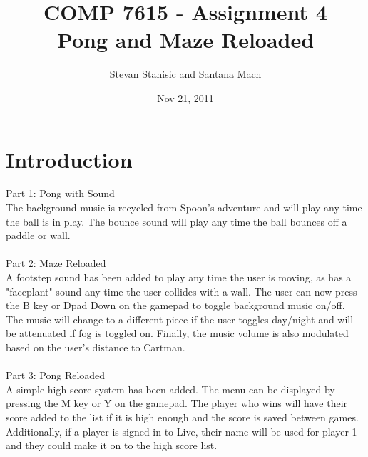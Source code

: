 \documentclass[titlepage]{article}
\begin{document}
\author{Stevan Stanisic and Santana Mach}
\title{COMP 7615 - Assignment 4 \\ Pong and Maze Reloaded}
\date{Nov 21, 2011}
\maketitle{}

\pagebreak

\section{Introduction}

Part 1: Pong with Sound \\
The background music is recycled from Spoon's adventure and will play any time the ball is in play. The bounce sound will play any time the ball bounces off a paddle or wall. \\
\\
Part 2: Maze Reloaded \\
A footstep sound has been added to play any time the user is moving, as has a "faceplant" sound any time the user collides with a wall. The user can now press the B key or Dpad Down
on the gamepad to toggle background music on/off. The music will change to a different piece if the user toggles day/night and will be attenuated if fog is toggled on. Finally, the music volume
is also modulated based on the user's distance to Cartman. \\
\\
Part 3: Pong Reloaded \\
A simple high-score system has been added. The menu can be displayed by pressing the M key or Y on the gamepad. The player who wins will have their score added to the list if it is
high enough and the score is saved between games.  Additionally, if a player is signed in to Live, their name will be used for player 1 and they could make it on to the high score list. \\
\\
\\
\end{document}
